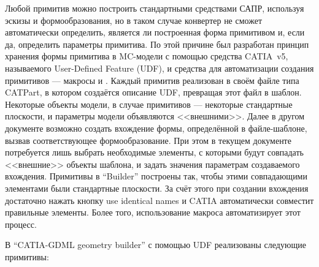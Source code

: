 Любой примитив можно построить стандартными средствами САПР, используя эскизы и формообразования, но в таком случае конвертер не сможет автоматически определить, является ли построенная форма примитивом и, если да, определить параметры примитива. По этой причине был разработан принцип хранения формы примитива в MC-модели с помощью средства CATIA~v5, называемого User-Defined Feature (UDF), и средства для автоматизации создания примитивов --- макросы  и . Каждый примитив реализован в своём файле типа CATPart, в котором создаётся описание UDF, превращая этот файл в шаблон. Некоторые объекты модели, в случае примитивов --- некоторые стандартные плоскости, и параметры модели объявляются <<внешними>>. Далее в другом документе возможно создать вхождение формы, определённой в файле-шаблоне, вызвав соответствующее формообразование. При этом в текущем документе потребуется лишь выбрать необходимые элементы, с которыми будут совпадать <<внешние>> объекты шаблона, и задать значения параметрам создаваемого вхождения. Примитивы в ``Builder'' построены так, чтобы этими совпадающими элементами были стандартные плоскости. За счёт этого при создании вхождения достаточно нажать кнопку use identical names и CATIA автоматически совместит правильные элементы. Более того, использование макроса  автоматизирует этот процесс.

В ``CATIA-GDML geometry builder'' с помощью UDF реализованы следующие примитивы:


